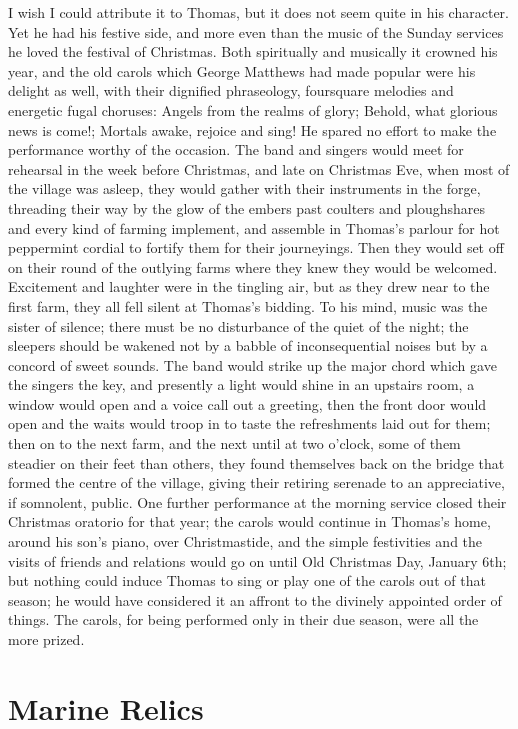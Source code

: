 I wish I could attribute it to Thomas, but it does not seem quite in his character. Yet he had his festive side, and more even than the music of the Sunday services he loved the festival of Christmas. Both spiritually and musically it crowned his year, and the old carols which George Matthews had made popular were his delight as well, with their dignified phraseology, foursquare melodies and energetic fugal choruses: Angels from the realms of glory; Behold, what glorious news is come!; Mortals awake, rejoice and sing! He spared no effort to make the performance worthy of the occasion. The band and singers would meet for rehearsal in the week before Christmas, and late on Christmas Eve, when most of the village was asleep, they would gather with their instruments in the forge, threading their way by the glow of the embers past coulters and ploughshares and every kind of farming implement, and assemble in Thomas's parlour for hot peppermint cordial to fortify them for their journeyings. Then they would set off on their round of the outlying farms where they knew they would be welcomed. Excitement and laughter were in the tingling air, but as they drew near to the first farm, they all fell silent at Thomas's bidding. To his mind, music was the sister of silence; there must be no disturbance of the quiet of the night; the sleepers should be wakened not by a babble of inconsequential noises but by a concord of sweet sounds. The band would strike up the major chord which gave the singers the key, and presently a light would shine in an upstairs room, a window would open and a voice call out a greeting, then the front door would open and the waits would troop in to taste the refreshments laid out for them; then on to the next farm, and the next until at two o'clock, some of them steadier on their feet than others, they found themselves back on the bridge that formed the centre of the village, giving their retiring serenade to an appreciative, if somnolent, public. One further performance at the morning service closed their Christmas oratorio for that year; the carols would continue in Thomas's home, around his son's piano, over Christmastide, and the simple festivities and the visits of friends and relations would go on until Old Christmas Day, January 6th; but nothing could induce Thomas to sing or play one of the carols out of that season; he would have considered it an affront to the divinely appointed order of things. The carols, for being performed only in their due season, were all the more prized.
 
\section{Marine Relics}

